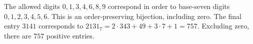 The allowed digits $0,1,3,4,6,8,9$ correspond in order to base-seven digits $0,1,2,3,4,5,6$. This is an order-preserving bijection, including zero. The final entry $3141$ corresponds to $2131_7=2\cdot343+49+3\cdot7+1=757$. Excluding zero, there are $\boxed{757}$ positive entries.
